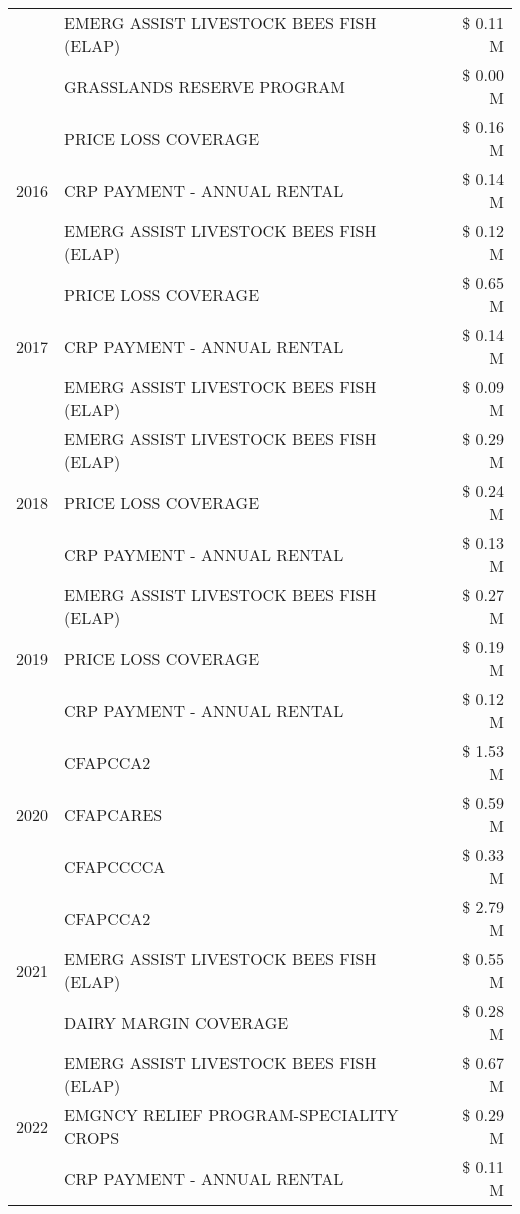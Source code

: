 \begin{tabular}{llr}
 & EMERG ASSIST LIVESTOCK BEES FISH (ELAP) & \$ 0.11 M \\
 & GRASSLANDS RESERVE PROGRAM & \$ 0.00 M \\
\cline{1-3}
\multirow[t]{3}{*}{2016} & PRICE LOSS COVERAGE & \$ 0.16 M \\
 & CRP PAYMENT - ANNUAL RENTAL & \$ 0.14 M \\
 & EMERG ASSIST LIVESTOCK BEES FISH (ELAP) & \$ 0.12 M \\
\cline{1-3}
\multirow[t]{3}{*}{2017} & PRICE LOSS COVERAGE & \$ 0.65 M \\
 & CRP PAYMENT - ANNUAL RENTAL & \$ 0.14 M \\
 & EMERG ASSIST LIVESTOCK BEES FISH (ELAP) & \$ 0.09 M \\
\cline{1-3}
\multirow[t]{3}{*}{2018} & EMERG ASSIST LIVESTOCK BEES FISH (ELAP) & \$ 0.29 M \\
 & PRICE LOSS COVERAGE & \$ 0.24 M \\
 & CRP PAYMENT - ANNUAL RENTAL & \$ 0.13 M \\
\cline{1-3}
\multirow[t]{3}{*}{2019} & EMERG ASSIST LIVESTOCK BEES FISH (ELAP) & \$ 0.27 M \\
 & PRICE LOSS COVERAGE & \$ 0.19 M \\
 & CRP PAYMENT - ANNUAL RENTAL & \$ 0.12 M \\
\cline{1-3}
\multirow[t]{3}{*}{2020} & CFAPCCA2 & \$ 1.53 M \\
 & CFAPCARES & \$ 0.59 M \\
 & CFAPCCCCA & \$ 0.33 M \\
\cline{1-3}
\multirow[t]{3}{*}{2021} & CFAPCCA2 & \$ 2.79 M \\
 & EMERG ASSIST LIVESTOCK BEES FISH (ELAP) & \$ 0.55 M \\
 & DAIRY MARGIN COVERAGE & \$ 0.28 M \\
\cline{1-3}
\multirow[t]{3}{*}{2022} & EMERG ASSIST LIVESTOCK BEES FISH (ELAP) & \$ 0.67 M \\
 & EMGNCY RELIEF PROGRAM-SPECIALITY CROPS & \$ 0.29 M \\
 & CRP PAYMENT - ANNUAL RENTAL & \$ 0.11 M \\
\cline{1-3}
\bottomrule
\end{tabular}
